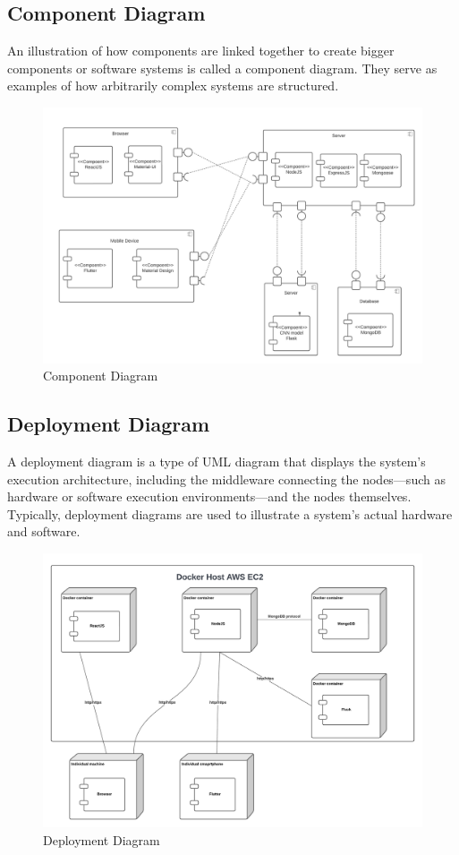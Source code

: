 \subsection{Component Diagram}
An illustration of how components are linked together to create bigger components or software systems is called a component diagram. They serve as examples of how arbitrarily complex systems are structured.

\begin{figure}[H]
\begin{center}
\includegraphics[width=18cm]{./diagnosis-system/conception/component.png}
\end{center}
\caption{Component Diagram}
\label{fig:}
\end{figure}

\subsection{Deployment Diagram}
A deployment diagram is a type of UML diagram that displays the system's execution architecture, including the middleware connecting the nodes—such as hardware or software execution environments—and the nodes themselves. Typically, deployment diagrams are used to illustrate a system's actual hardware and software.

\begin{figure}[H]
\begin{center}
\includegraphics[width=18cm]{./diagnosis-system/conception/deployment.png}
\end{center}
\caption{Deployment Diagram}
\label{fig:dep}
\end{figure}

    
